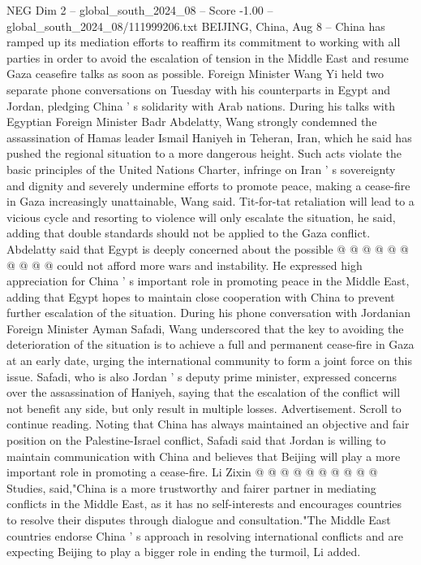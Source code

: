 \begin{textsample}{NEG Dim 2 – global\_south\_2024\_08 – Score -1.00 – global\_south\_2024\_08/111999206.txt}  \label{ex:f2_neg_109}
BEIJING, China, Aug 8 -- China has ramped up its mediation efforts to reaffirm its commitment to working with all parties in order to avoid the escalation of tension in the Middle East and resume Gaza ceasefire talks as soon as possible.
Foreign Minister Wang Yi held two separate phone conversations on Tuesday with his counterparts in Egypt and Jordan, pledging China ' s solidarity with Arab nations.
During his talks with Egyptian Foreign Minister Badr Abdelatty, Wang strongly condemned the assassination of Hamas leader Ismail Haniyeh in Teheran, Iran, which he said has pushed the regional situation to a more dangerous height.
Such acts violate the basic principles of the United Nations Charter, infringe on Iran ' s sovereignty and dignity and severely undermine efforts to promote peace, making a cease-fire in Gaza increasingly unattainable, Wang said.
Tit-for-tat retaliation will lead to a vicious cycle and resorting to violence will only escalate the situation, he said, adding that double standards should not be applied to the Gaza conflict.
Abdelatty said that Egypt is deeply concerned about the possible @ @ @ @ @ @ @ @ @ @ could not afford more wars and instability.
He expressed high appreciation for China ' s important role in promoting peace in the Middle East, adding that Egypt hopes to maintain close cooperation with China to prevent further escalation of the situation.
During his phone conversation with Jordanian Foreign Minister Ayman Safadi, Wang underscored that the key to avoiding the deterioration of the situation is to achieve a full and permanent cease-fire in Gaza at an early date, urging the international community to form a joint force on this issue.
Safadi, who is also Jordan ' s deputy prime minister, expressed concerns over the assassination of Haniyeh, saying that the escalation of the conflict will not benefit any side, but only result in multiple losses.
Advertisement.
Scroll to continue reading.
Noting that China has always maintained an objective and fair position on the Palestine-Israel conflict, Safadi said that Jordan is willing to maintain communication with China and believes that Beijing will play a more important role in promoting a cease-fire.
Li Zixin @ @ @ @ @ @ @ @ @ @ Studies, said,"China is a more trustworthy and fairer partner in mediating conflicts in the Middle East, as it has no self-interests and encourages countries to resolve their disputes through dialogue and consultation."The Middle East countries endorse China ' s approach in resolving international conflicts and are expecting Beijing to play a bigger role in ending the turmoil, Li added.

\end{textsample}
